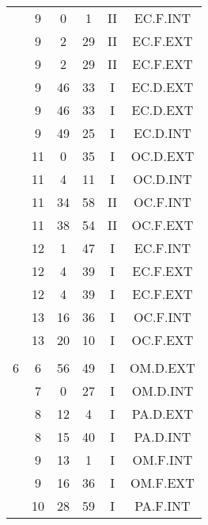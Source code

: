\documentclass[12pt, a4paper]{article}
\begin{document}
\begin{multicols}{3}
{\begin{tabular}{c c c c c c}
	 	 	 	 & 9 & 0 & 1 & II & EC.F.INT\\%
	 	 	 	 & 9 & 2 & 29 & II & EC.F.EXT\\%
	 	 	 	 & 9 & 2 & 29 & II & EC.F.EXT\\%
	 	 	 	 & 9 & 46 & 33 & I & EC.D.EXT\\%
	 	 	 	 & 9 & 46 & 33 & I & EC.D.EXT\\%
	 	 	 	 & 9 & 49 & 25 & I & EC.D.INT\\%
	 	 	 	 & 11 & 0 & 35 & I & OC.D.EXT\\%
	 	 	 	 & 11 & 4 & 11 & I & OC.D.INT\\%
	 	 	 	 & 11 & 34 & 58 & II & OC.F.INT\\%
	 	 	 	 & 11 & 38 & 54 & II & OC.F.EXT\\%
	 	 	 	 & 12 & 1 & 47 & I & EC.F.INT\\%
	 	 	 	 & 12 & 4 & 39 & I & EC.F.EXT\\%
	 	 	 	 & 12 & 4 & 39 & I & EC.F.EXT\\%
	 	 	 	 & 13 & 16 & 36 & I & OC.F.INT\\%
	 	 	 	 & 13 & 20 & 10 & I & OC.F.EXT\\%
	 	 	 	 & & & & & \\%
	 	 	 	6 & 6 & 56 & 49 & I & OM.D.EXT\\%
	 	 	 	 & 7 & 0 & 27 & I & OM.D.INT\\%
	 	 	 	 & 8 & 12 & 4 & I & PA.D.EXT\\%
	 	 	 	 & 8 & 15 & 40 & I & PA.D.INT\\%
	 	 	 	 & 9 & 13 & 1 & I & OM.F.INT\\%
	 	 	 	 & 9 & 16 & 36 & I & OM.F.EXT\\%
	 	 	 	 & 10 & 28 & 59 & I & PA.F.INT\\%

\end{tabular}}
\end{multicols}
\end{document}
